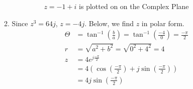 \documentclass[10pt,a4paper, margin=1in]{article}
\begin{document}
\begin{enumerate}
\begin{enumerate}
\begin{itemize}
\begin{figure}[!htbp]
\begin{center}
\end{center}
\caption{ \textit{\textbf{$z=-1+i$}} is plotted on on the Complex Plane}
\end{figure}
		
	\end{itemize}
    
    \item %
    Since $z^3=64j$, $z=-4j$. Below, we find $z$ in polar form.
	\begin{equation}
	\begin{split}
		\Theta & = \tan^{-1}{\left( \frac{b}{a} \right)} = \tan^{-1}{\left( \frac{-4}{0} \right)} = \frac{-\pi}{2} \\
		r & = \sqrt{a^2+b^2} = \sqrt{0^2+4^2} = 4 \\
		z & = 4e^{j\frac{-\pi}{2}} \\
		& = 4\left( \cos{\left( \frac{-\pi}{2} \right)}+j\sin{\left( \frac{-\pi}{2} \right)} \right) \\
		& = 4j\sin{\left( \frac{-\pi}{2} \right)}
	\end{split}
	\end{equation}
    

\end{enumerate}
\end{enumerate}
\end{document}
